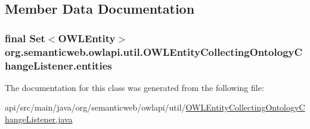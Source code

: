 \subsection{Member Data Documentation}
\hypertarget{classorg_1_1semanticweb_1_1owlapi_1_1util_1_1_o_w_l_entity_collecting_ontology_change_listener_af6f782f7e3f8fad29eabe84ca6549167}{
\subsubsection[{entities}]{\setlength{\rightskip}{0pt plus 5cm}final Set$<${\bf O\-W\-L\-Entity}$>$ org.\-semanticweb.\-owlapi.\-util.\-O\-W\-L\-Entity\-Collecting\-Ontology\-Change\-Listener.\-entities\hspace{0.3cm}{\ttfamily [private]}}}\label{classorg_1_1semanticweb_1_1owlapi_1_1util_1_1_o_w_l_entity_collecting_ontology_change_listener_af6f782f7e3f8fad29eabe84ca6549167}


The documentation for this class was generated from the following file\-:\begin{DoxyCompactItemize}
\item 
api/src/main/java/org/semanticweb/owlapi/util/\hyperlink{_o_w_l_entity_collecting_ontology_change_listener_8java}{O\-W\-L\-Entity\-Collecting\-Ontology\-Change\-Listener.\-java}\end{DoxyCompactItemize}
